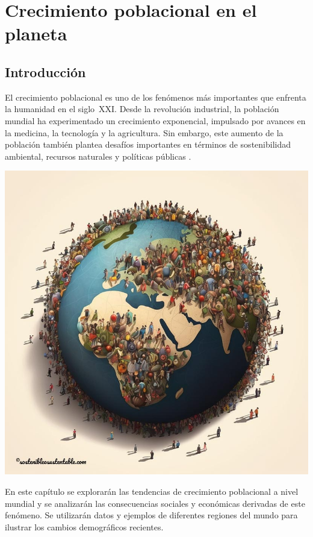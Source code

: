 \chapter{Crecimiento poblacional en el planeta}

\section{Introducción}

El crecimiento poblacional es uno de los fenómenos más importantes que enfrenta la humanidad en el siglo~XXI. Desde la revolución industrial, la población mundial ha experimentado un crecimiento exponencial, impulsado por avances en la medicina, la tecnología y la agricultura. Sin embargo, este aumento de la población también plantea desafíos importantes en términos de sostenibilidad ambiental, recursos naturales y políticas públicas \parencites[192]{@5292-WORLD2021}[]{@5293-UN2019}.

\begin{imagen}[h!]
	\centering
	\includegraphics[width=\textwidth]{./media/people.jpg}
	\caption{}
\end{imagen}

En este capítulo se explorarán las tendencias de crecimiento poblacional a nivel mundial y se analizarán las consecuencias sociales y económicas derivadas de este fenómeno. Se utilizarán datos y ejemplos de diferentes regiones del mundo para ilustrar los cambios demográficos recientes.


